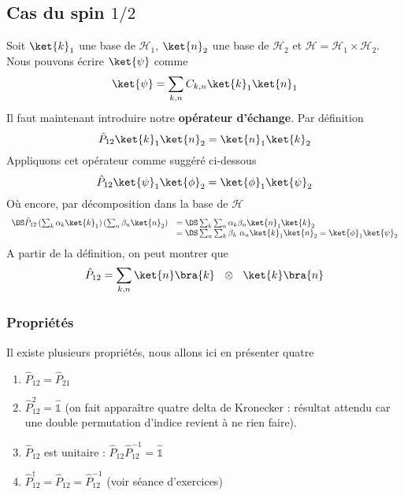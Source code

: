 \subsection{Cas du spin $1/2$}
Soit $\ket{k}_1$ une base de $\mathcal{H}_1$, $\ket{n}_2$ une base de $\mathcal{H}_2$ et $\mathcal{H} = 
\mathcal{H}_1\times\mathcal{H}_2$. Nous pouvons écrire $\ket{\psi}$ comme
\begin{equation}
\ket{\psi} = \sum_{k,n} C_{k,n} \ket{k}_1\ket{n}_1
\end{equation}
Il faut maintenant introduire notre \textbf{opérateur d'échange}. Par définition
\begin{equation}
\hat{P}_{12}\ket{k}_1\ket{n}_2 = \ket{n}_1\ket{k}_2
\end{equation}
Appliquons cet opérateur comme suggéré ci-dessous
\begin{equation}
\hat{P}_{12} \ket{\psi}_1\ket{\phi}_2=\ket{\phi}_1\ket{\psi}_2
\end{equation}
Où encore, par décomposition dans la base de $\mathcal{H}$
\begin{equation}
\begin{array}{ll}
\DS\hat{P}_{12}\left(\sum_k \alpha_k\ket{k}_1\right)\left(\sum_n \beta_n\ket{n}_2\right) &=\DS \sum_k\sum_n \alpha_k
\beta_n \ket{n}_1\ket{k}_2\\
&=\DS \sum_n\sum_k \beta_k\ \alpha_n \ket{k}_1\ket{n}_2 = \ket{\phi}_1\ket{\psi}_2
\end{array}
\end{equation}
A partir de la définition, on peut montrer que
\begin{equation}
\hat{P}_{12}= \sum_{k,n} \ket{n}\bra{k}\ \ \otimes\ \ \ket{k}\bra{n}
\end{equation}

\subsubsection{Propriétés}
Il existe plusieurs propriétés, nous allons ici en présenter quatre 
\begin{enumerate}
\item $\hat{P}_{12}=\hat{P}_{21}$
\item $\hat{P}_{12}^2 = \hat{\mathbb{1}}$ (on fait apparaître quatre delta de Kronecker : résultat attendu car une double permutation d'indice revient à ne rien faire).
\item $\hat{P}_{12}$ est unitaire : $\hat{P}_{12}\hat{P}_{12}^{-1} = \hat{\mathbb{1}}$
\item $\hat{P}_{12}^\dagger = \hat{P}_{12} = \hat{P}_{12}^{-1}$ (voir séance d'exercices)
\end{enumerate}

